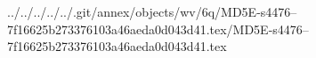 ../../../../../.git/annex/objects/wv/6q/MD5E-s4476--7f16625b273376103a46aeda0d043d41.tex/MD5E-s4476--7f16625b273376103a46aeda0d043d41.tex